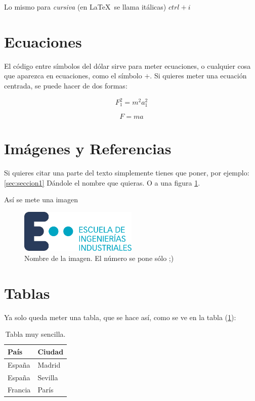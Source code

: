\documentclass{article}
\begin{document}
Lo mismo para \textit{cursiva} (en \LaTeX \ se llama itálicas) $ctrl+i$

\section{Ecuaciones}
El código entre símbolos del dólar sirve para meter ecuaciones, o cualquier cosa que aparezca en ecuaciones, como el símbolo $ + $. Si quieres meter una ecuación centrada, se puede hacer de dos formas:

$$
F_{1}^2 = m^{2} a_{1}^{2}
$$

\begin{equation}
F = ma
\end{equation}

\section{Imágenes y Referencias}
Si quieres citar una parte del texto simplemente tienes que poner, por ejemplo: \ref{sec:seccion1} Dándole el nombre que quieras. O a una figura \ref{fig:nombre para referenciar la imagen}.


\newpage
Así se mete una imagen
\begin{figure}[hbtp]
    \centering
	\includegraphics[width = 0.5\textwidth]{Images/logo_eii.pdf}
    \caption{Nombre de la imagen. El número se pone sólo ;)}
    \label{fig:nombre para referenciar la imagen}
\end{figure}

\section{Tablas}
Ya solo queda meter una tabla, que se hace así, como se ve en la tabla (\ref{tabla:sencilla}):

\begin{table}[htbp]
\begin{center}
\begin{tabular}{|l|l|}
\hline
País & Ciudad \\
\hline \hline
España & Madrid \\ \hline
España & Sevilla \\ \hline
Francia & París \\ \hline
\end{tabular}
\caption{Tabla muy sencilla.}
\label{tabla:sencilla}
\end{center}
\end{table}
\end{document}
